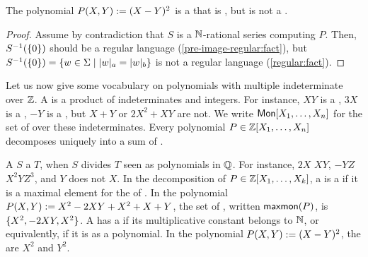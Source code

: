 \begin{example}
    The polynomial $P(X, Y) \mathrel{:=} (X - Y)^2$
    is a  that is ,
    but is
    not a .
\end{example}
\begin{proof}
    Assume by contradiction that
    $S$ is a $\mathbb{N}$-rational series computing $P$.
    Then, $S^{-1}(\mathopen{\{} 0 \mathclose{\}})$ should be a regular language
    (\cref{pre-image-regular:fact}),
    but $S^{-1}(\set{0}) = \setof{ w \in \Sigma }{ \card[a]{w} = \card[b]{w} }$
    is not a regular language (\cref{regular:fact}).
\end{proof}


\AP Let us now give some vocabulary on polynomials with multiple indeterminate
over $\mathbb{Z}$. A  is a product of indeterminates and integers.
For instance, $XY$ is a , $3 X$ is a , $-Y$ is a
, but $X + Y$ or $2X^2 + XY$ are not. We write $\Monomials[X_1,
\dots, X_n]$ for the set of  over these indeterminates.
Every polynomial $P \in \mathbb{Z}[X_1, \dots, X_n]$ decomposes uniquely
into a sum of .

\AP A  $S$  a  $T$, when $S$ divides
$T$ seen as polynomials in $\mathbb{Q}$. For instance, $2X$  $XY$, $-YZ$
 $X^2 Y Z^3$, and $Y$ does not  $X$. In the
decomposition of $P \in \mathbb{Z}[X_1, \dots, X_k]$, a  is a
 if it is a maximal element for the  of . In the polynomial $P(X,Y) \mathrel{:=} X^2 - 2XY + X^2
+ X + Y$, the set of , written
$\mathop{\mathsf{maxmon}}(P)$, is $\mathopen{\{} X^2,  -2 XY,  X^2 \mathclose{\}}$. A  has a
 if its multiplicative constant belongs to
$\mathbb{N}$, or equivalently, if it is  as a polynomial. In the
polynomial $P(X,Y) \mathrel{:=} (X - Y)^2$, the  are $X^2$
and $Y^2$.




